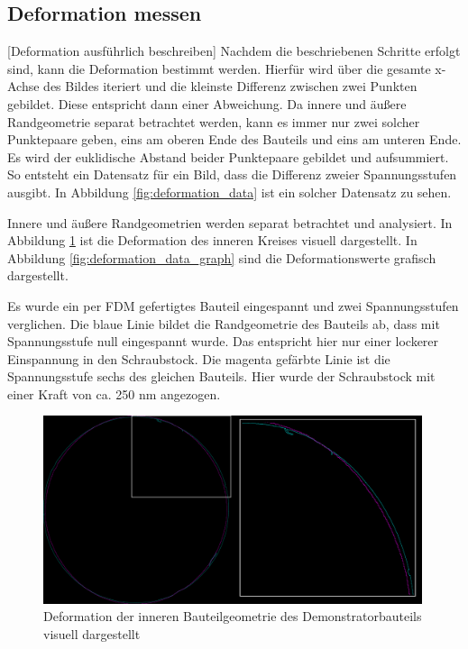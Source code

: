 \subsection{Deformation messen}

[Deformation ausführlich beschreiben]
Nachdem die beschriebenen Schritte erfolgt sind, kann die Deformation bestimmt werden.
Hierfür wird über die gesamte x-Achse des Bildes iteriert und die kleinste Differenz 
zwischen zwei Punkten gebildet. Diese entspricht dann einer Abweichung. 
Da innere und äußere Randgeometrie separat betrachtet werden, kann es immer nur zwei
solcher Punktepaare geben, eins am oberen Ende des Bauteils und eins am unteren Ende.
Es wird der euklidische Abstand beider Punktepaare gebildet und aufsummiert.
So entsteht ein Datensatz für ein Bild, 
dass die Differenz zweier Spannungsstufen ausgibt. In Abbildung \ref{fig:deformation_data}
ist ein solcher Datensatz zu sehen. 

Innere und äußere Randgeometrien werden separat betrachtet und analysiert.
In Abbildung \ref{fig:deformation_data_vis} ist die Deformation des inneren Kreises
visuell dargestellt. In Abbildung \ref{fig:deformation_data_graph} sind die 
Deformationswerte grafisch dargestellt.

Es wurde ein per FDM gefertigtes Bauteil eingespannt und zwei Spannungsstufen verglichen.
Die blaue Linie bildet die Randgeometrie des Bauteils ab, dass mit Spannungsstufe
null eingespannt wurde. Das entspricht hier nur einer lockerer Einspannung in den 
Schraubstock. Die magenta gefärbte Linie ist die Spannungsstufe sechs des gleichen
Bauteils. Hier wurde der Schraubstock mit einer Kraft von ca. 250 nm angezogen.

\begin{figure}[H]
    \centering
    \includegraphics[width=0.99\textwidth]{images/FDM2_SP0_stitched_FDM2_SP4_stitched_1_1_cut.png}
    \caption{Deformation der inneren Bauteilgeometrie des Demonstratorbauteils 
    visuell dargestellt}
    \label{fig:deformation_data_vis}
\end{figure}


